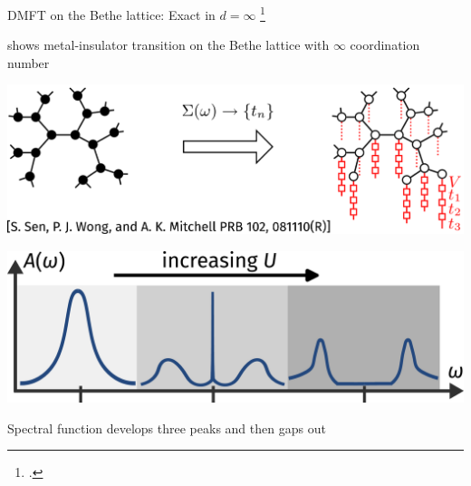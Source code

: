 \documentclass[9pt,aspectratio=169]{beamer}
\begin{document}
\begin{frame}{DMFT on the Bethe lattice: Exact in \(d=\infty\)}
\footcite{metzner_volhardt_1989,kotliar1996,parcollet_2004,maier_2005,kotliar_rmp_2006,ohashi_2008,held_2013,sen_2020}

\begin{itemize}
\begin{minipage}{0.4\textwidth}
\nitem shows \alert{metal-insulator transition} on the Bethe lattice with \(\infty\) coordination number
\end{minipage}
\hspace*{\fill}
\begin{minipage}{0.45\textwidth}
\includegraphics[width=\textwidth]{bethe-lattice.pdf}
\end{minipage}

\vspace*{\fill}

\begin{minipage}{0.45\textwidth}
\includegraphics[width=\textwidth]{dmft-sf.pdf}
\end{minipage}
\hspace*{\fill}
\begin{minipage}{0.4\textwidth}
\nitem Spectral function develops three peaks and then \alert{gaps out}
\end{minipage}

\vspace*{\fill}


\end{itemize}
\end{frame}
\end{document}
